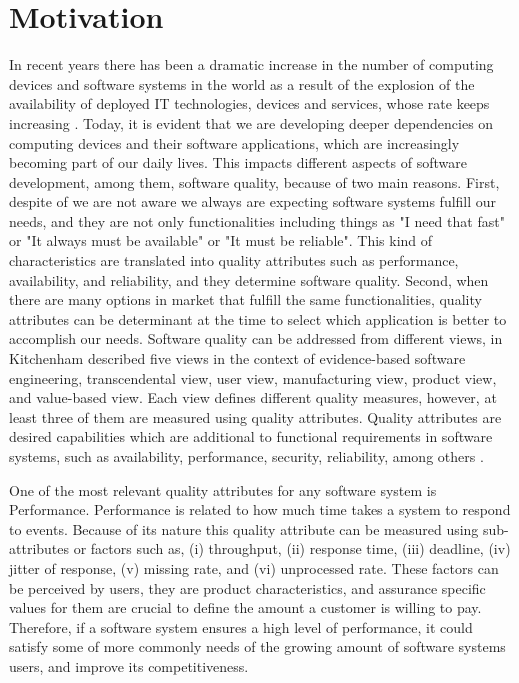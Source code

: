 

\section{Motivation}
\label{sec:motivation}
In recent years there has been a dramatic increase in the number of computing devices and software systems in the world as a result of the explosion of the availability of deployed IT technologies, devices and services, whose rate keeps increasing \cite{internet2015}. Today, it is evident that we are  developing deeper dependencies on computing devices and their software applications, which are increasingly becoming part of our daily lives. This impacts different aspects of software development, among them, software quality, because of two main reasons. First, despite of we are not aware we always are expecting software systems fulfill our needs, and they are not only functionalities including things as "I need that fast" or "It always must be available" or "It must be reliable". This kind of characteristics are translated into quality attributes such as performance, availability, and reliability, and they determine software quality. Second, when there are many options in market that fulfill the same functionalities, quality attributes can be determinant at the time to select which application is better to accomplish our needs. Software quality can be addressed from different views, in \cite{kitchenham2009systematic} Kitchenham described five views in the context of evidence-based software engineering, transcendental view, user view, manufacturing view, product view, and value-based view. Each view defines different quality measures, however, at least three of them are measured using quality attributes. Quality attributes are desired capabilities which are additional to functional requirements in software systems, such as availability, performance, security, reliability, among others \cite{barbacci1995quality}\cite{Munoz-et-al:2012:surprise-user-controlled}. 

One of the most relevant quality attributes for any software system is Performance. Performance is related to how much time takes a system to respond to events. Because of its nature this quality attribute can be measured using sub-attributes or factors such as, (i) throughput, (ii) response time, (iii) deadline, (iv) jitter of response, (v) missing rate, and (vi) unprocessed rate. These factors can be perceived by users, they are product characteristics, and assurance specific values for them are crucial to define the amount a customer is willing to pay. Therefore, if a software system ensures a high level of performance, it could  satisfy some of more commonly needs of the growing amount of software systems users, and improve its competitiveness.

